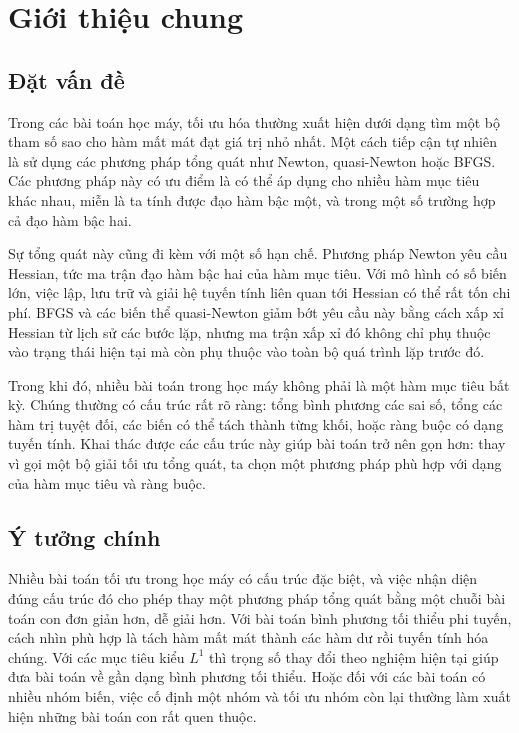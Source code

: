 
\section{Giới thiệu chung}
\label{SEC_gioi_thieu_chung}

\subsection{Đặt vấn đề}
\label{SUB_SEC_dat_van_de}
Trong các bài toán học máy, tối ưu hóa thường xuất hiện dưới dạng tìm một bộ tham số sao cho hàm mất mát đạt giá trị nhỏ nhất. Một cách tiếp cận tự nhiên là sử dụng các phương pháp tổng quát như Newton, quasi-Newton hoặc BFGS. Các phương pháp này có ưu điểm là có thể áp dụng cho nhiều hàm mục tiêu khác nhau, miễn là ta tính được đạo hàm bậc một, và trong một số trường hợp cả đạo hàm bậc hai.
\medskip

Sự tổng quát này cũng đi kèm với một số hạn chế. Phương pháp Newton yêu cầu Hessian, tức ma trận đạo hàm bậc hai của hàm mục tiêu. Với mô hình có số biến lớn, việc lập, lưu trữ và giải hệ tuyến tính liên quan tới Hessian có thể rất tốn chi phí. BFGS và các biến thể quasi-Newton giảm bớt yêu cầu này bằng cách xấp xỉ Hessian từ lịch sử các bước lặp, nhưng ma trận xấp xỉ đó không chỉ phụ thuộc vào trạng thái hiện tại mà còn phụ thuộc vào toàn bộ quá trình lặp trước đó.
\medskip

Trong khi đó, nhiều bài toán trong học máy không phải là một hàm mục tiêu bất kỳ. Chúng thường có cấu trúc rất rõ ràng: tổng bình phương các sai số, tổng các hàm trị tuyệt đối, các biến có thể tách thành từng khối, hoặc ràng buộc có dạng tuyến tính. Khai thác được các cấu trúc này giúp bài toán trở nên gọn hơn: thay vì gọi một bộ giải tối ưu tổng quát, ta chọn một phương pháp phù hợp với dạng của hàm mục tiêu và ràng buộc.

\subsection{Ý tưởng chính}
\label{SUB_SEC_y_tuong_chinh}
Nhiều bài toán tối ưu trong học máy có cấu trúc đặc biệt, và việc nhận diện đúng cấu trúc đó cho phép thay một phương pháp tổng quát bằng một chuỗi bài toán con đơn giản hơn, dễ giải hơn. Với bài toán bình phương tối thiểu phi tuyến, cách nhìn phù hợp là tách hàm mất mát thành các hàm dư rồi tuyến tính hóa chúng. Với các mục tiêu kiểu $L^1$ thì trọng số thay đổi theo nghiệm hiện tại giúp đưa bài toán về gần dạng bình phương tối thiểu. Hoặc đối với các bài toán có nhiều nhóm biến, việc cố định một nhóm và tối ưu nhóm còn lại thường làm xuất hiện những bài toán con rất quen thuộc.

